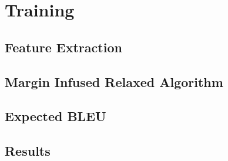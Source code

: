 \chapter{Training}
\section{Feature Extraction}
\section{Margin Infused Relaxed Algorithm}
\section{Expected BLEU}
\section{Results}
